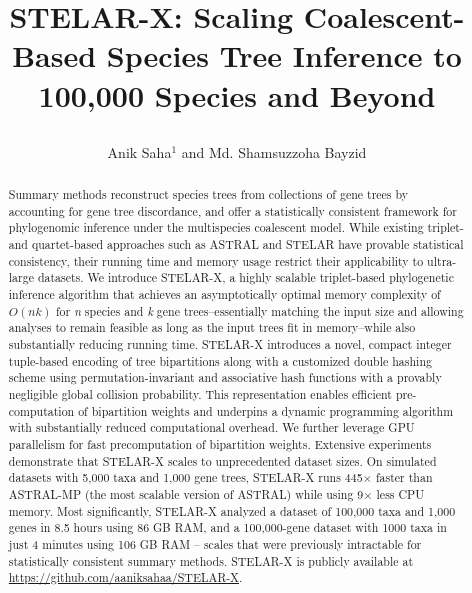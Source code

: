 \documentclass[10pt,a4paper]{article}
\title{STELAR-X: Scaling Coalescent-Based Species Tree Inference to 100,000 Species and Beyond
\author[1,*]{Anik Saha$^{1}$ and Md. Shamsuzzoha Bayzid}
}
\affil[1]{Department of Computer Science and Engineering\protect\\Bangladesh University of Engineering and Technology, Dhaka-1205, Bangladesh}
\affil[*]{Corresponding author: shams\_bayzid@cse.buet.ac.bd}
\date{}
\newcommand{\add}[1]{{\color{blue} #1}}
\newcommand{\add}[1]{{\color{blue} #1}}
\begin{document}
\maketitle


\begin{abstract}


Summary methods reconstruct species trees from collections of gene trees by accounting for gene tree discordance, and offer a statistically consistent framework for phylogenomic inference under the multispecies coalescent model.
While existing triplet- and quartet-based approaches such as ASTRAL and STELAR have provable statistical consistency, their running time and memory usage restrict their applicability to ultra-large datasets. We introduce STELAR-X, a highly scalable triplet-based phylogenetic inference algorithm that achieves an asymptotically optimal memory complexity of $O(nk)$ for \textit{n} species and \textit{k} gene trees--essentially matching the input size and allowing analyses to remain feasible as long as the input trees fit in memory--while also substantially reducing running time. STELAR-X introduces a novel, compact integer tuple-based encoding of tree bipartitions along with a customized double hashing scheme using permutation-invariant and associative hash functions with a provably negligible global collision probability. This representation enables efficient pre-computation of bipartition weights and underpins a dynamic programming algorithm with substantially reduced computational overhead.
We further leverage GPU parallelism for fast precomputation of bipartition weights. Extensive experiments demonstrate that STELAR-X scales to unprecedented dataset sizes. On simulated datasets with 5,000 taxa and 1,000 gene trees, STELAR-X runs 445$\times$ faster than ASTRAL-MP (the most scalable version of ASTRAL) while using 9$\times$ less CPU memory. Most significantly, STELAR-X analyzed a dataset of 100,000 taxa and 1,000 genes in  8.5 hours using 86 GB RAM, and a 100,000-gene dataset with 1000 taxa in just 4 minutes using 106 GB RAM -- scales that were previously intractable for statistically consistent summary methods. STELAR-X is publicly available at \url{https://github.com/aaniksahaa/STELAR-X}.


\end{abstract}
\end{document}
